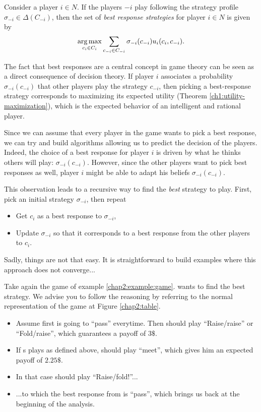 \begin{definition}
Consider a player $i \in N$. If the players $-i$ play following the strategy profile $\sigma_{-i} \in \Delta(C_{-i})$, then the set of \emph{best response strategies} for player $i \in N$ is given by 
$$ \operatorname*{arg\,max}_{c_i \in C_i} \sum_{c_{-i} \in C_{-i}} \sigma_{-i}(c_{-i}) u_i(c_i, c_{-i}).$$
\end{definition} 

The fact that best responses are a central concept in game theory can be seen as a direct consequence of decision theory. If player $i$ associates a probability $\sigma_{-i}(c_{-i}) $ that other players play the strategy $c_{-i}$, then picking a best-response strategy corresponds to maximizing its expected utility (Theorem \ref{ch1:utility-maximization}), which is the expected behavior of an intelligent and rational player. 

Since we can assume that every player in the game wants to pick a best response, we can try and build algorithms allowing us to predict the decision of the players. 
Indeed, the choice of a best response for player $i$ is driven by what he thinks others will play: $\sigma_{-i}(c_{-i}) $. However, since the other players want to pick best responses as well, player $i$ might be able to adapt his beliefs $\sigma_{-i}(c_{-i}) $.

This observation leads to a recursive way to  find the \emph{best} strategy to play. First, pick an initial strategy $\sigma_{-i}$,  then repeat
\begin{itemize}
 \item Get $c_i$ as a best response to $\sigma_{-i}$, 
 \item Update $\sigma_{-i}$ so that it corresponds to a best response from the other players to $c_i$.
\end{itemize}

Sadly, things are not that easy. It is straightforward to build examples where this approach does not converge...

\begin{example}
Take again the game of example \ref{chap2:example:game}. \TAtwo{} wants to find the best strategy. We advise you to follow the reasoning by referring to the normal representation of the game at Figure \ref{chap2:table}.

\begin{itemize}
\item Assume first \TAone{} is going to ``pass'' everytime. Then \TAtwo{} should play ``Raise/raise'' or ``Fold/raise'', which guarantees a payoff of $3\$$.
\item If \TAtwo{}s plays as defined above, \TAone{} should play ``meet'', which gives him an expected payoff of $2.25\$$.
\item In that case \TAtwo{} should play ``Raise/fold!''...
\item ...to which the best response from \TAone{} is ``pass'', which brings us back at the beginning of the analysis.
\end{itemize}

\label{chap2:example:bestresponseequilibria}
\end{example}

